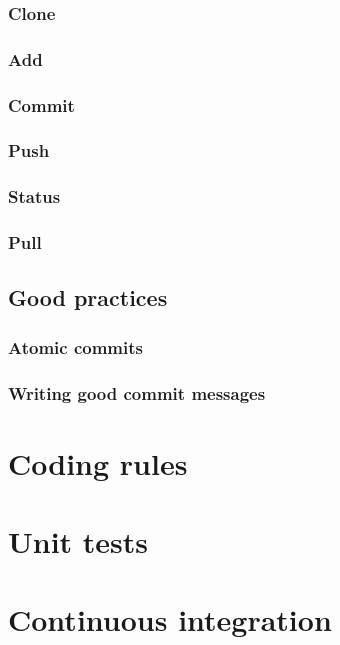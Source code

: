\documentclass[12pt]{book}
\begin{document}
\subsubsection{Clone}

\subsubsection{Add}

\subsubsection{Commit}


\subsubsection{Push}


\subsubsection{Status}


\subsubsection{Pull}


\subsection{Good practices}


\subsubsection{Atomic commits}

\subsubsection{Writing good commit messages}



\section{Coding rules}
\section{Unit tests}
\section{Continuous integration}
\end{document}
